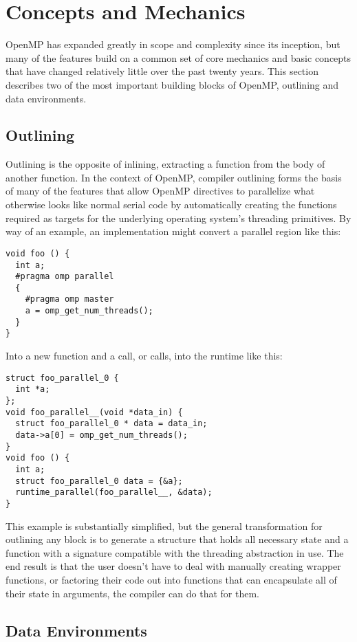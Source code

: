 \section{Concepts and Mechanics}
\label{sec:concepts}

OpenMP has expanded greatly in scope and complexity since its inception, but
many of the features build on a common set of core mechanics and basic concepts
that have changed relatively little over the past twenty years.  This section
describes two of the most important building blocks of OpenMP, outlining and
data environments.

\subsection{Outlining}
\label{sub:outlining}

Outlining is the opposite of inlining, extracting a function from the body
of another function.  In the context of OpenMP, compiler outlining forms the
basis of many of the features that allow OpenMP directives to parallelize what
otherwise looks like normal serial code by automatically creating the functions
required as targets for the underlying operating system's threading primitives.
By way of an example, an implementation might convert a parallel region like
this:

\begin{verbatim}
void foo () {
  int a;
  #pragma omp parallel
  {
    #pragma omp master
    a = omp_get_num_threads();
  }
}
\end{verbatim}

Into a new function and a call, or calls, into the runtime like this:

\begin{verbatim}
struct foo_parallel_0 {
  int *a;
};
void foo_parallel__(void *data_in) {
  struct foo_parallel_0 * data = data_in;
  data->a[0] = omp_get_num_threads();
}
void foo () {
  int a;
  struct foo_parallel_0 data = {&a};
  runtime_parallel(foo_parallel__, &data);
}
\end{verbatim}

This example is substantially simplified, but the general transformation for
outlining any block is to generate a structure that holds all necessary state
and a function with a signature compatible with the threading abstraction in
use.  The end result is that the user doesn't have to deal with manually
creating wrapper functions, or factoring their code out into functions that can
encapsulate all of their state in arguments, the compiler can do that for them.

\subsection{Data Environments}
\label{sub:data_environments}



